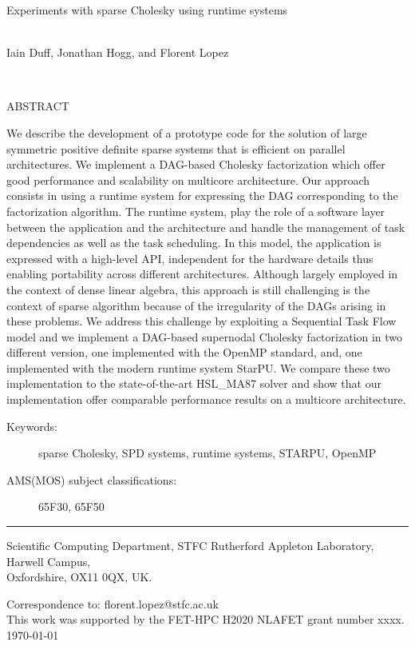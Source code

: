 \documentclass{article}
\newcommand{\starpu}{{StarPU}\xspace}
\newcommand{\openmp}{OpenMP\xspace}
\newcommand{\ma}{HSL\_MA87\xspace}
\newcommand{\stfccovertitle}
{Experiments with sparse Cholesky using runtime systems}
\newcommand{\theabstract}{We describe the development of a prototype
  code for the solution of large symmetric positive definite sparse
  systems that is efficient on parallel architectures. We implement a
  DAG-based Cholesky factorization which offer good performance and
  scalability on multicore architecture.  Our approach consists in
  using a runtime system for expressing the DAG corresponding to the
  factorization algorithm. The runtime system, play the role of a
  software layer between the application and the architecture and
  handle the management of task dependencies as well as the task
  scheduling. In this model, the application is expressed with a
  high-level API, independent for the hardware details thus enabling
  portability across different architectures. Although largely
  employed in the context of dense linear algebra, this approach is
  still challenging is the context of sparse algorithm because of the
  irregularity of the DAGs arising in these problems. We address this
  challenge by exploiting a Sequential Task Flow model and we
  implement a DAG-based supernodal Cholesky factorization in two
  different version, one implemented with the \openmp standard, and,
  one implemented with the modern runtime system \starpu. We compare
  these two implementation to the state-of-the-art \ma solver and show
  that our implementation offer comparable performance results on a
  multicore architecture. }
\begin{document}
\begin{titlepage}

\vspace*{-0.5cm}

\vspace{1.0 cm}

{\Large \bf
\begin{center}
   \stfccovertitle
\end{center}}

\begin{center}
\mbox{} \\
      Iain Duff, 
      Jonathan Hogg, and Florent Lopez
     
\mbox{} \\
\end{center}

\vspace{1.0cm}


\noindent
{\large ABSTRACT}

\vspace{0.3cm}
\noindent
\theabstract

\vspace{0.6cm}

\begin{description}
\item [Keywords:] sparse Cholesky, SPD systems, runtime systems, STARPU, OpenMP
\item [AMS(MOS) subject classifications:]  65F30, 65F50
\end{description}

\vspace{0.1 cm}

\noindent \rule{15cm}{0.001in}
\vspace{0.1 cm}

\begin{description}

\item Scientific Computing Department, STFC Rutherford Appleton
  Laboratory, Harwell Campus,\\ Oxfordshire, OX11 0QX, UK.
\end{description}
\noindent
Correspondence to: florent.lopez@stfc.ac.uk\\
This work was supported by the FET-HPC H2020 NLAFET grant number xxxx.\\


\vspace{1.1 cm}
\noindent \today

\end{titlepage}
\end{document}
